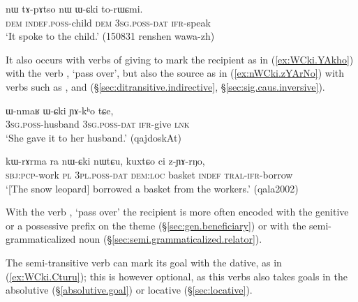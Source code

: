 \begin{exe}
\ex \label{ex:WCki.torWCmi}
\gll nɯ tɤ-pɤtso nɯ ɯ-ɕki to-rɯɕmi. \\
\textsc{dem} \textsc{indef}.\textsc{poss}-child \textsc{dem} \textsc{3sg}.\textsc{poss}-\textsc{dat} \textsc{ifr}-speak \\
\glt  `It spoke to the child.' (150831 renshen wawa-zh) 
\end{exe}

It also occurs with verbs of giving to mark the recipient as in (\ref{ex:WCki.YAkho}) with the verb , `pass over', but also the source as in (\ref{ex:nWCki.zYArNo}) with verbs such as ,  and  (§\ref{sec:ditransitive.indirective}, §\ref{sec:sig.caus.inversive}).

 

\begin{exe}
\ex \label{ex:WCki.YAkho}
\gll  ɯ-nmaʁ ɯ-ɕki ɲɤ-kʰo tɕe,  \\
\textsc{3sg}.\textsc{poss}-husband \textsc{3sg}.\textsc{poss}-\textsc{dat} \textsc{ifr}-give \textsc{lnk} \\
\glt `She gave it to her husband.' (qajdoskAt)
\end{exe}

\begin{exe}
\ex \label{ex:nWCki.zYArNo}
\gll 
kɯ-rɤrma ra nɯ-ɕki nɯtɕu, kuxtɕo ci z-ɲɤ-rŋo, \\
\textsc{sbj}:\textsc{pcp}-work \textsc{pl} \textsc{3pl}.\textsc{poss}-\textsc{dat} \textsc{dem}:\textsc{loc} basket \textsc{indef} \textsc{tral}-\textsc{ifr}-borrow \\
\glt `[The snow leopard] borrowed a basket from the workers.' (qala2002)
\end{exe}

With the verb , `pass over' the recipient is more often encoded with the genitive or a possessive prefix on the theme (§\ref{sec:gen.beneficiary}) or with the semi-gram\-ma\-ti\-ca\-lized noun  (§\ref{sec:semi.grammaticalized.relator}).

 
The semi-transitive verb  can mark its goal with the dative, as in (\ref{ex:WCki.Cturu}); this is however optional, as this verbs also takes goals in the absolutive (§\ref{absolutive.goal}) or locative (§\ref{sec:locative}).

